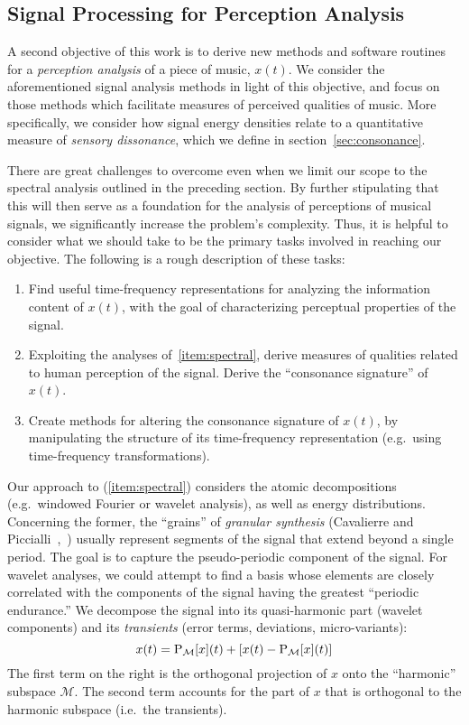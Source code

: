 \subsection{Signal Processing for Perception Analysis}
A second objective of this work is to derive new methods and software
routines for a \emph{perception analysis} of a piece of music, $x(t)$.
We consider the aforementioned signal analysis methods in light of this objective,
and focus on those methods which
facilitate measures of perceived qualities of music.  More specifically, we
consider how signal energy densities relate to a quantitative measure of
\emph{sensory dissonance}, which we define in section~\ref{sec:consonance}. 

There are great challenges to overcome even when we limit our scope to the
spectral analysis outlined in the preceding section.  By further
stipulating that this will then serve as a foundation for the analysis of
perceptions of musical signals, we significantly increase the problem's
complexity. Thus, it is helpful to consider what we should take to be the
primary tasks involved in reaching our objective.  The following is a rough
description of these tasks:
\begin{enumerate}
\item \label{item:spectral} Find useful time-frequency representations for
  analyzing the information content of $x(t)$, with the goal of characterizing
  perceptual  properties of the signal.
\item \label{item:dissonance} Exploiting the analyses of~\ref{item:spectral},
  derive measures of qualities related to human perception of the signal.
  Derive the ``consonance signature'' of $x(t)$. 
\item Create methods for altering the consonance signature of $x(t)$, by
  manipulating the structure of its time-frequency representation (e.g.~using
  time-frequency transformations).
\end{enumerate}

Our approach to (\ref{item:spectral}) considers the atomic decompositions
(e.g.~windowed Fourier or wavelet analysis), as well as energy distributions. 
Concerning the former, the ``grains'' of \emph{granular synthesis} (Cavalierre
and Piccialli~\cite{Cavaliere:1997},~\cite{Roads:1997}) usually represent
segments of the signal that extend beyond a single period. The goal is to
capture the pseudo-periodic component of the signal. For wavelet analyses, we
could attempt to find a basis whose elements are closely correlated with the
components of the signal having the greatest ``periodic endurance.''
We decompose the signal into its quasi-harmonic part (wavelet
components) and its \emph{transients} (error terms, deviations,
micro-variants):
\[
x(t) = \P_{\mathcal{M}}[x](t) 
       + [x(t) - \P_{\mathcal{M}}[x](t)]
\]
The first term on the right is the orthogonal projection of $x$
onto the ``harmonic'' subspace $\mathcal{M}$.  The second term
accounts for the part of $x$ that is orthogonal to the harmonic
subspace (i.e.~the transients).

